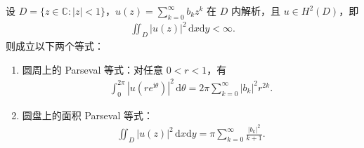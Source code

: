 \documentclass[../../main.tex]{subfiles}%
\begin{document}
\begin{theorem}[Parseval恒等式]\label{theorem:复分析-Parseval恒等式}
设 $D=\{z\in\mathbb{C}:|z|<1\}$，$u(z)=\sum_{k=0}^{\infty} b_k z^k$ 在 $D$ 内解析，且 $u\in H^2(D)$，即
\begin{align}
\iint_D |u(z)|^2\,\mathrm{d}x\mathrm{d}y<\infty. \nonumber
\end{align}
则成立以下两个等式：
\begin{enumerate}[(1)]
\item 圆周上的 Parseval 等式：对任意 $0<r<1$，有
\begin{align*}
\int_0^{2\pi} |u(r e^{\mathrm{i}\theta})|^2\,\mathrm{d}\theta
=2\pi\sum_{k=0}^{\infty} |b_k|^2 r^{2k}. 
\end{align*}

\item 圆盘上的面积 Parseval 等式：
\begin{align*}
\iint_D |u(z)|^2\,\mathrm{d}x\mathrm{d}y
=\pi\sum_{k=0}^{\infty}\frac{|b_k|^2}{k+1}.
\end{align*}
\end{enumerate}
\end{theorem}
\end{document}
